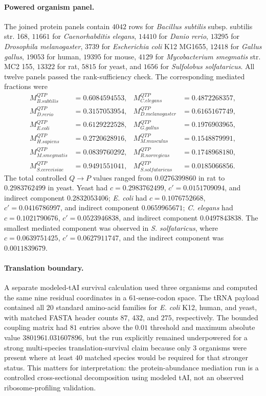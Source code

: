\paragraph{Powered organism panel.}
The joined protein panels contain $4042$ rows for \emph{Bacillus subtilis} subsp. subtilis str. 168, $11661$ for \emph{Caenorhabditis elegans}, $14410$ for \emph{Danio rerio}, $13295$ for \emph{Drosophila melanogaster}, $3739$ for \emph{Escherichia coli} K12 MG1655, $12418$ for \emph{Gallus gallus}, $19053$ for human, $19395$ for mouse, $4129$ for \emph{Mycobacterium smegmatis} str. MC2 155, $13322$ for rat, $5815$ for yeast, and $1656$ for \emph{Sulfolobus solfataricus}.  All twelve panels passed the rank-sufficiency check.  The corresponding mediated fractions were
$$
\begin{aligned}
M^{QTP}_{B.subtilis} &= 0.6084594553, & M^{QTP}_{C.elegans} &= 0.4872268357,\\
M^{QTP}_{D.rerio} &= 0.3157053954, & M^{QTP}_{D.melanogaster} &= 0.6165167749,\\
M^{QTP}_{E.coli} &= 0.6129222528, & M^{QTP}_{G.gallus} &= 0.1976903965,\\
M^{QTP}_{H.sapiens} &= 0.2720628916, & M^{QTP}_{M.musculus} &= 0.1548879991,\\
M^{QTP}_{M.smegmatis} &= 0.0839760292, & M^{QTP}_{R.norvegicus} &= 0.1748968180,\\
M^{QTP}_{S.cerevisiae} &= 0.9491551041, & M^{QTP}_{S.solfataricus} &= 0.0185066856.
\end{aligned}
$$
The total controlled $Q\to P$ values ranged from $0.0276399860$ in rat to $0.2983762499$ in yeast.  Yeast had $c=0.2983762499$, $c'=0.0151709094$, and indirect component $0.2832053406$; \emph{E. coli} had $c=0.1076752668$, $c'=0.0416786997$, and indirect component $0.0659965671$; \emph{C. elegans} had $c=0.1021790676$, $c'=0.0523946838$, and indirect component $0.0497843838$.  The smallest mediated component was observed in \emph{S. solfataricus}, where $c=0.0639751425$, $c'=0.0627911747$, and the indirect component was $0.0011839679$.

\paragraph{Translation boundary.}
A separate modeled-tAI survival calculation used three organisms and computed the same nine residual coordinates in a $61$-sense-codon space.  The tRNA payload contained all $20$ standard amino-acid families for \emph{E. coli} K12, human, and yeast, with matched FASTA header counts $87$, $432$, and $275$, respectively.  The bounded coupling matrix had $81$ entries above the $0.01$ threshold and maximum absolute value $3801961.031607896$, but the run explicitly remained underpowered for a strong multi-species translation-survival claim because only $3$ organisms were present where at least $40$ matched species would be required for that stronger status.  This matters for interpretation: the protein-abundance mediation run is a controlled cross-sectional decomposition using modeled tAI, not an observed ribosome-profiling validation.

